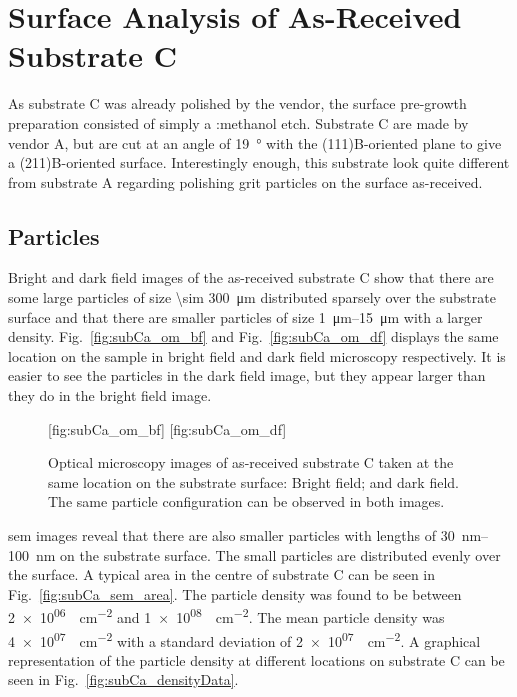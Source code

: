 \clearpage
\section{Surface Analysis of As-Received Substrate C}\label{sec:subCa}
As substrate C was already polished by the vendor, the surface pre-growth preparation consisted of simply a :methanol etch. Substrate C are made by vendor A, but are cut at an angle of \SI{19}{\degree} with the (111)B-oriented plane to give a (211)B-oriented surface. Interestingly enough, this substrate look quite different from substrate A regarding polishing grit particles on the surface as-received.

\subsection{Particles}
Bright and dark field images of the as-received substrate C show that there are some large particles of size \SI{\sim 300}{\micro\metre} distributed sparsely over the substrate surface and that there are smaller particles of size \SIrange{1}{15}{\micro\metre} with a larger density. Fig.~\ref{fig:subCa_om_bf} and Fig.~\ref{fig:subCa_om_df} displays the same location on the sample in bright field and dark field microscopy respectively. It is easier to see the particles in the dark field image, but they appear larger than they do in the bright field image.

\begin{figure}[htbp]
    \centering
    [fig:subCa_om_bf]
    \hfill
    [fig:subCa_om_df]
    \caption[Bright and dark field optical microscopy images of as-received substrate C.]{Optical microscopy images of as-received substrate C taken at the same location on the substrate surface:  Bright field; and  dark field. The same particle configuration can be observed in both images.}
    \label{fig:subCa_om}
\end{figure}

\Ac{sem} images reveal that there are also smaller particles with lengths of \SIrange{30}{100}{\nano\metre} on the substrate surface. The small particles are distributed evenly over the surface. A typical area in the centre of substrate C can be seen in Fig.~\ref{fig:subCa_sem_area}. The particle density was found to be between \SI{2e+06}{\particle\centi\metre^{-2}} and \SI{1e+08}{\particle\centi\metre^{-2}}. The mean particle density was \SI{4e+07}{\particle\centi\metre^{-2}} with a standard deviation of \SI{2e+07}{\particle\centi\metre^{-2}}. A graphical representation of the particle density at different locations on substrate C can be seen in Fig.~\ref{fig:subCa_densityData}.

